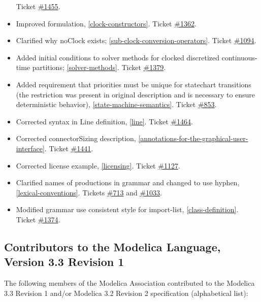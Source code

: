 \documentclass[../MLS.tex]{subfiles}
\begin{document}
\begin{itemize}
  Ticket \href{https://trac.modelica.org/Modelica/ticket/1455}{\#1455}.
\item
  Improved formulation, \autoref{clock-constructors}. Ticket
  \href{https://trac.modelica.org/Modelica/ticket/1362}{\#1362}.
\item
  Clarified why noClock exists; \autoref{sub-clock-conversion-operators}. Ticket
  \href{https://trac.modelica.org/Modelica/ticket/1094}{\#1094}.
\item
  Added initial conditions to solver methods for clocked discretized
  continuous-time partitions; \autoref{solver-methods}. Ticket
  \href{https://trac.modelica.org/Modelica/ticket/1379}{\#1379}.
\item
  Added requirement that priorities must be unique for statechart
  transitions (the restriction was present in original description and
  is necessary to ensure deterministic behavior), \autoref{state-machine-semantics}. Ticket
  \href{https://trac.modelica.org/Modelica/ticket/853}{\#853}.
\item
  Corrected syntax in Line definition, \autoref{line}. Ticket
  \href{https://trac.modelica.org/Modelica/ticket/1464}{\#1464}.
\item
  Corrected connectorSizing description, \autoref{annotations-for-the-graphical-user-interface}. Ticket
  \href{https://trac.modelica.org/Modelica/ticket/1441}{\#1441}.
\item
  Corrected license example, \autoref{licensing}. Ticket
  \href{https://trac.modelica.org/Modelica/ticket/1127}{\#1127}.
\item
  Clarified names of productions in grammar and changed to use hyphen,
  \autoref{lexical-conventions}. Tickets
  \href{https://trac.modelica.org/Modelica/ticket/713}{\#713} and
  \href{https://trac.modelica.org/Modelica/ticket/1033}{\#1033}.
\item
  Modified grammar use consistent style for import-list, \autoref{class-definition}.
  Ticket \href{https://trac.modelica.org/Modelica/ticket/1374}{\#1374}.
\end{itemize}

\subsection{Contributors to the Modelica Language, Version 3.3 Revision 1}

The following members of the Modelica Association contributed to the
Modelica 3.3 Revision 1 and/or Modelica 3.2 Revision 2 specification
(alphabetical list):
\end{document}

